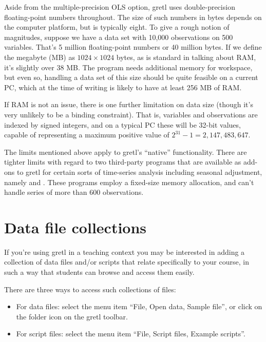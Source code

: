 Aside from the multiple-precision OLS option, gretl uses
double-precision floating-point numbers throughout.  The size of such
numbers in bytes depends on the computer platform, but is typically
eight.  To give a rough notion of magnitudes, suppose we have a data
set with 10,000 observations on 500 variables.  That's 5 million
floating-point numbers or 40 million bytes.  If we define the megabyte
(MB) as $1024 \times 1024$ bytes, as is standard in talking about RAM,
it's slightly over 38 MB.  The program needs additional memory for
workspace, but even so, handling a data set of this size should be
quite feasible on a current PC, which at the time of writing is likely
to have at least 256 MB of RAM.  

If RAM is not an issue, there is one further limitation on data size
(though it's very unlikely to be a binding constraint).  That is,
variables and observations are indexed by signed integers, and on a
typical PC these will be 32-bit values, capable of representing
a maximum positive value of $2^{31} - 1 = 2,147,483,647$.

The limits mentioned above apply to gretl's ``native''
functionality.  There are tighter limits with regard to two
third-party programs that are available as add-ons to gretl for
certain sorts of time-series analysis including seasonal adjustment,
namely  and .  These programs employ
a fixed-size memory allocation, and can't handle series of more than
600 observations.


\section{Data file collections}
\label{collections}

If you're using gretl in a teaching context you may be
interested in adding a collection of data files and/or scripts that
relate specifically to your course, in such a way that students can
browse and access them easily.

There are three ways to access such collections of files:

\begin{itemize}
\item For data files: select the menu item ``File, Open data, Sample
  file'', or click on the folder icon on the gretl toolbar.
\item For script files: select the menu item ``File, Script
  files, Example scripts''.
\end{itemize}

